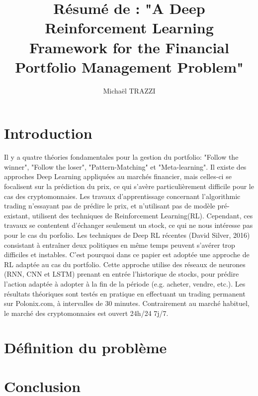 \documentclass{article}
\title{Résumé de : "A Deep Reinforcement Learning Framework for the
Financial Portfolio Management Problem"}
\author{Michaël TRAZZI}
\begin{document}
\maketitle

\section{Introduction}
Il y a quatre théories fondamentales pour la gestion du portfolio: "Follow the winner", "Follow the loser", "Pattern-Matching" et "Meta-learning". Il existe des approches Deep Learning appliquées au marchés financier, mais celles-ci se focalisent sur la prédiction du prix, ce qui s'avère particulièrement difficile pour le cas des cryptomonnaies. Les travaux d'apprentissage concernant l'algorithmic trading n'essayant pas de prédire le prix, et n'utilisant pas de modèle pré-existant, utilisent des techniques de Reinforcement Learning(RL). Cependant, ces travaux se contentent d'échanger seulement un stock, ce qui ne nous intéresse pas pour le cas du porfolio. Les techniques de Deep RL récentes (David Silver, 2016) consistant à entraîner deux politiques en même temps peuvent s'avérer trop difficiles et instables. C'est pourquoi dans ce papier est adoptée une approche de RL adaptée au cas du portfolio. Cette approche utilise des réseaux de neurones (RNN, CNN et LSTM) prenant en entrée l'historique de stocks, pour prédire l'action adaptée à adopter à la fin de la période (e.g. acheter, vendre, etc.). Les résultats théoriques sont testés en pratique en effectuant un trading permanent sur Polonix.com, à intervalles de 30 minutes. Contrairement au marché habituel, le marché des cryptomonnaies est ouvert 24h/24 7j/7.

\section{Définition du problème}



\section{Conclusion}
\end{document}

